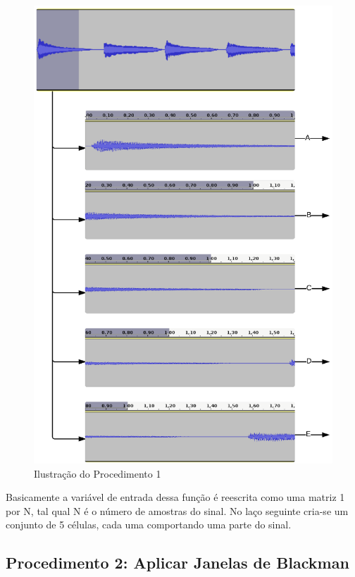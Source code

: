 \begin{figure}[h] 
  \centering
    \includegraphics[keepaspectratio=true, scale=0.7]{figuras/procedimento_1}
    \caption{Ilustração do Procedimento 1}
    \label{fig:procedimento_1}
\end{figure}


Basicamente a variável de entrada dessa função é reescrita como uma matriz 1 por N, tal qual N é o número de amostras do sinal. No laço seguinte cria-se um conjunto de 5 células, cada uma comportando uma parte do sinal.

\subsection{Procedimento 2: Aplicar Janelas de Blackman}
\label{subsec:procedimento_2}

